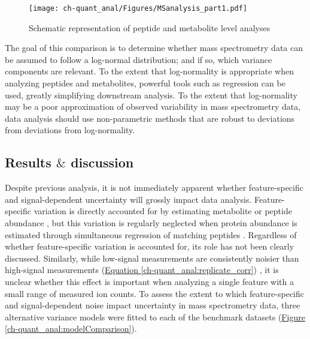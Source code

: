 \begin{figure}[h!]
\begin{center}
\texttt{[image: ch-quant\_anal/Figures/MSanalysis\_part1.pdf]}
\caption[Schematic representation of peptide-level and metabolite-level analyses]{Schematic representation of peptide and metabolite level analyses}
\label{ch-quant_anal:MSworkflow_p1}
\end{center}
\end{figure}

The goal of this comparison is to determine whether mass spectrometry data can be assumed to follow a log-normal distribution; and if so, which variance components are relevant. To the extent that log-normality is appropriate when analyzing peptides and metabolites, powerful tools such as regression can be used, greatly simplifying downstream analysis. To the extent that log-normality may be a poor approximation of observed variability in mass spectrometry data, data analysis should use non-parametric methods that are robust to deviations from deviations from log-normality.

\subsection{Results $\&$ discussion}

Despite previous analysis, it is not immediately apparent whether feature-specific and signal-dependent uncertainty will grossly impact data analysis. Feature-specific variation is directly accounted for by estimating metabolite or peptide abundance \cite{Costenoble:2011hia, Boer:2010fb}, but this variation is regularly neglected when protein abundance is estimated through simultaneous regression of matching peptides \cite{Oberg:2012bm}. Regardless of whether feature-specific variation is accounted for, its role has not been clearly discussed.  Similarly, while low-signal measurements are consistently noisier than high-signal measurements (\hyperref[ch-quant_anal:replicate_corr]{Equation \ref{ch-quant_anal:replicate_corr}}) \cite{Zhu:2011jr,Oberg:2012bm,Navarro:2014ke}, it is unclear whether this effect is important when analyzing a single feature with a small range of measured ion counts. To assess the extent to which feature-specific and signal-dependent noise impact uncertainty in mass spectrometry data, three alternative variance models were fitted to each of the benchmark datasets (\hyperref[ch-quant_anal:modelComparison]{Figure \ref{ch-quant_anal:modelComparison}}). 

